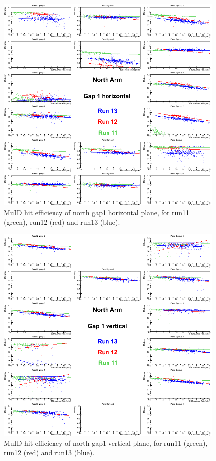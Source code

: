 \begin{figure}[h!]

  \centering
  \includegraphics[width=0.99\textwidth]{./figures/efficomp_North_gap1_horizontal.png}
  \caption{\label{Fig:efficiency:MuIdEff:a1g1p0}MuID hit efficiency of north gap1 horizontal plane, for run11 (green), run12 (red) and run13 (blue).}
\end{figure}
\clearpage


\begin{figure}[h!]

  \centering
  \includegraphics[width=0.99\textwidth]{./figures/efficomp_North_gap1_vertical.png}
  \caption{\label{Fig:efficiency:MuIdEff:a1g1p1}MuID hit efficiency of north gap1 vertical plane, for run11 (green), run12 (red) and run13 (blue).}
\end{figure}
\clearpage


